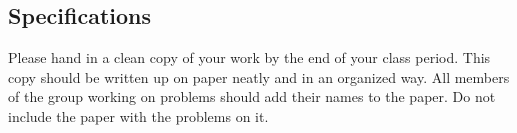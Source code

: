 \documentclass[11pt]{article}
\begin{document}
% 
% 
% 

\subsection*{Specifications}

Please hand in a clean copy of your work by the end of your class period. This copy should be written up on paper neatly and in an organized way. All members of the group working on problems should add their names to the paper. Do not include the paper with the problems on it. 
\end{document}
